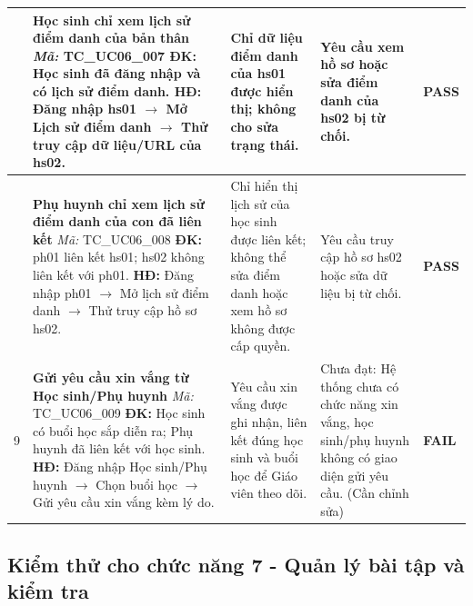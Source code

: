 \begin{longtable}{|>{\centering\arraybackslash}p{0.8cm}|>{\raggedright\arraybackslash}p{4.6cm}|>{\raggedright\arraybackslash}p{3.8cm}|>{\raggedright\arraybackslash}p{3.8cm}|>{\centering\arraybackslash}p{1.5cm}|}
7 & \textbf{Học sinh chỉ xem lịch sử điểm danh của bản thân} \newline\newline \textit{Mã:} TC\_UC06\_007 \newline\newline \textbf{ĐK:} Học sinh đã đăng nhập và có lịch sử điểm danh. \newline \textbf{HĐ:} Đăng nhập hs01 $\rightarrow$ Mở Lịch sử điểm danh $\rightarrow$ Thử truy cập dữ liệu/URL của hs02. 
& Chỉ dữ liệu điểm danh của hs01 được hiển thị; không cho sửa trạng thái. 
& Yêu cầu xem hồ sơ hoặc sửa điểm danh của hs02 bị từ chối. 
& \textbf{PASS} \\
\hline

8 & \textbf{Phụ huynh chỉ xem lịch sử điểm danh của con đã liên kết} \newline\newline \textit{Mã:} TC\_UC06\_008 \newline\newline \textbf{ĐK:} ph01 liên kết hs01; hs02 không liên kết với ph01. \newline \textbf{HĐ:} Đăng nhập ph01 $\rightarrow$ Mở lịch sử điểm danh $\rightarrow$ Thử truy cập hồ sơ hs02. 
& Chỉ hiển thị lịch sử của học sinh được liên kết; không thể sửa điểm danh hoặc xem hồ sơ không được cấp quyền. 
& Yêu cầu truy cập hồ sơ hs02 hoặc sửa dữ liệu bị từ chối. 
& \textbf{PASS} \\
\hline

9 & \textbf{Gửi yêu cầu xin vắng từ Học sinh/Phụ huynh} \newline\newline \textit{Mã:} TC\_UC06\_009 \newline\newline \textbf{ĐK:} Học sinh có buổi học sắp diễn ra; Phụ huynh đã liên kết với học sinh. \newline \textbf{HĐ:} Đăng nhập Học sinh/Phụ huynh $\rightarrow$ Chọn buổi học $\rightarrow$ Gửi yêu cầu xin vắng kèm lý do. 
& Yêu cầu xin vắng được ghi nhận, liên kết đúng học sinh và buổi học để Giáo viên theo dõi. 
& Chưa đạt: Hệ thống chưa có chức năng xin vắng, học sinh/phụ huynh không có giao diện gửi yêu cầu. (Cần chỉnh sửa) 
& \textbf{FAIL} \\
\hline

\end{longtable}

\subsection{Kiểm thử cho chức năng 7 - Quản lý bài tập và kiểm tra}


